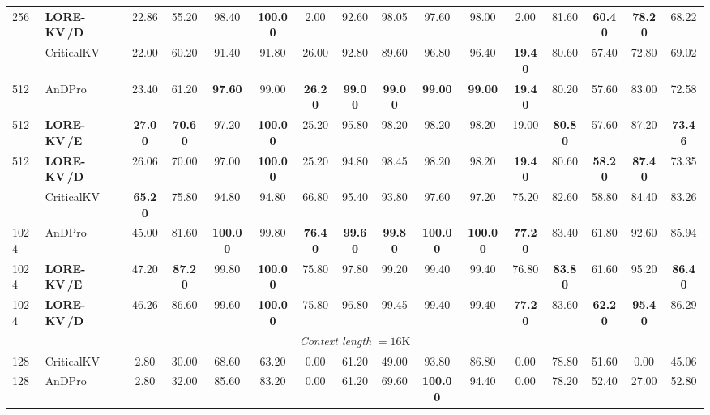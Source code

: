 \documentclass{article} %
\newcommand{\best}[1]{\textcolor{bestblue}{\textbf{#1}}}
\newcommand{\second}[1]{\textcolor{secondorange}{#1}}
\newcommand{\lorekvE}{LORE-KV\,/E}
\newcommand{\lorekvD}{LORE-KV\,/D}
\begin{document}
\begin{table}[p]
{\begin{tabular}{llcccccccccccccc}
256 & \textbf{\lorekvD} & \second{22.86} & \second{55.20} & 98.40 & \best{100.00} & 2.00 & 92.60 & \second{98.05} & \second{97.60} & \second{98.00} & \second{2.00} & \second{81.60} & \best{60.40} & \best{78.20} & \second{68.22} \\
\addlinespace[2pt]
512 & CriticalKV & 22.00 & 60.20 & 91.40 & 91.80 & \second{26.00} & 92.80 & 89.60 & 96.80 & 96.40 & \best{19.40} & \second{80.60} & 57.40 & 72.80 & 69.02 \\
512 & AnDPro & 23.40 & 61.20 & \best{97.60} & \second{99.00} & \best{26.20} & \best{99.00} & \best{99.00} & \best{99.00} & \best{99.00} & \best{19.40} & 80.20 & \second{57.60} & 83.00 & 72.58 \\
512 & \textbf{\lorekvE} & \best{27.00} & \best{70.60} & \second{97.20} & \best{100.00} & 25.20 & \second{95.80} & 98.20 & \second{98.20} & \second{98.20} & \second{19.00} & \best{80.80} & \second{57.60} & \second{87.20} & \best{73.46} \\
512 & \textbf{\lorekvD} & \second{26.06} & \second{70.00} & 97.00 & \best{100.00} & 25.20 & 94.80 & \second{98.45} & \second{98.20} & \second{98.20} & \best{19.40} & \second{80.60} & \best{58.20} & \best{87.40} & \second{73.35} \\
\addlinespace[2pt]
1024 & CriticalKV & \best{65.20} & 75.80 & 94.80 & 94.80 & 66.80 & 95.40 & 93.80 & 97.60 & 97.20 & 75.20 & 82.60 & 58.80 & 84.40 & 83.26 \\
1024 & AnDPro & 45.00 & 81.60 & \best{100.00} & \second{99.80} & \best{76.40} & \best{99.60} & \best{99.80} & \best{100.00} & \best{100.00} & \best{77.20} & 83.40 & \second{61.80} & 92.60 & 85.94 \\
1024 & \textbf{\lorekvE} & \second{47.20} & \best{87.20} & \second{99.80} & \best{100.00} & \second{75.80} & \second{97.80} & 99.20 & \second{99.40} & \second{99.40} & \second{76.80} & \best{83.80} & 61.60 & \second{95.20} & \best{86.40} \\
1024 & \textbf{\lorekvD} & 46.26 & \second{86.60} & 99.60 & \best{100.00} & \second{75.80} & 96.80 & \second{99.45} & \second{99.40} & \second{99.40} & \best{77.20} & \second{83.60} & \best{62.20} & \best{95.40} & \second{86.29} \\
\midrule
\multicolumn{16}{c}{\textit{Context length} $=16$K} \\
\midrule
128 & CriticalKV & 2.80 & 30.00 & 68.60 & 63.20 & \second{0.00} & 61.20 & 49.00 & \second{93.80} & 86.80 & 0.00 & 78.80 & 51.60 & 0.00 & 45.06 \\
128 & AnDPro & 2.80 & 32.00 & 85.60 & 83.20 & \second{0.00} & 61.20 & 69.60 & \best{100.00} & \second{94.40} & 0.00 & 78.20 & 52.40 & 27.00 & 52.80 \\

\end{tabular}}
\end{table}
\end{document}
